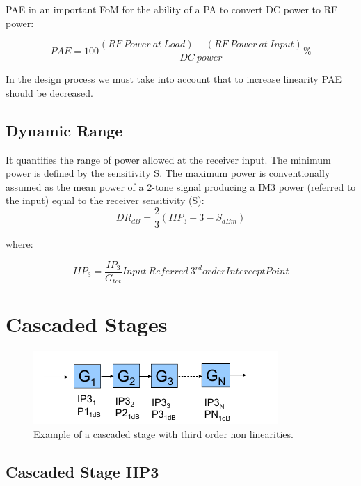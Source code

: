 PAE in an important FoM for the ability of a PA to convert DC power to RF power:

\begin{equation}
	PAE= 100\frac{(RF \ Power \ at \ Load)- (RF \ Power \ at \ Input)}{DC \ power}\%
\end{equation}

In the design process we must take into account that to increase linearity PAE should be decreased.

\subsection{Dynamic Range} %
\label{sub:dynamic_range}

It quantifies the range of power allowed at the receiver input.
The minimum power is defined by the sensitivity S.
The maximum power is conventionally assumed as the mean power of a 2-tone signal producing a IM3 power (referred to the input) equal to the receiver sensitivity (S):
\begin{equation}
DR_{dB}= \frac{2}{3}(IIP_3+3-S_{dBm})	
\end{equation}

where:

\begin{equation}
	IIP_3=\frac{IP_3}{G_{tot}} Input \ Referred \ 3^{rd} order Intercept Point
\end{equation}

\section{Cascaded Stages} %
\label{sec:cascaded_stages}

\begin{figure}[ht]
	\centering
	\includegraphics[scale=0.8]{Immagini/casip}
	\caption{Example of a cascaded stage with third order non linearities.}
	\label{fig:casip}
\end{figure}

\subsection{Cascaded Stage IIP3} %
\label{sec:cascaded_stage_iip3}


